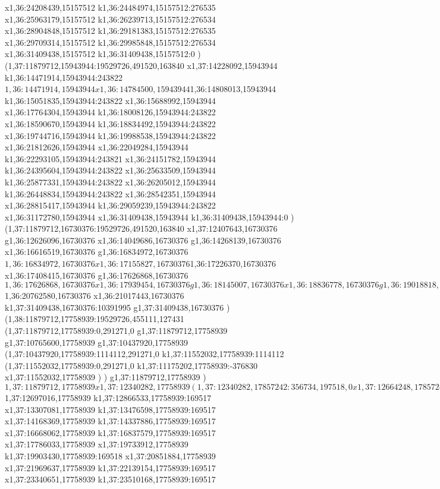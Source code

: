 {x1,36:24208439,15157512
k1,36:24484974,15157512:276535
x1,36:25963179,15157512
k1,36:26239713,15157512:276534
x1,36:28904848,15157512
k1,36:29181383,15157512:276535
x1,36:29709314,15157512
k1,36:29985848,15157512:276534
x1,36:31409438,15157512
k1,36:31409438,15157512:0
)
(1,37:11879712,15943944:19529726,491520,163840
x1,37:14228092,15943944
k1,36:14471914,15943944:243822
$1,36:14471914,15943944
x1,36:14784500,15943944
$1,36:14808013,15943944
k1,36:15051835,15943944:243822
x1,36:15688992,15943944
x1,36:17764304,15943944
k1,36:18008126,15943944:243822
x1,36:18590670,15943944
k1,36:18834492,15943944:243822
x1,36:19744716,15943944
k1,36:19988538,15943944:243822
x1,36:21812626,15943944
x1,36:22049284,15943944
k1,36:22293105,15943944:243821
x1,36:24151782,15943944
k1,36:24395604,15943944:243822
x1,36:25633509,15943944
k1,36:25877331,15943944:243822
x1,36:26205012,15943944
k1,36:26448834,15943944:243822
x1,36:28542351,15943944
x1,36:28815417,15943944
k1,36:29059239,15943944:243822
x1,36:31172780,15943944
x1,36:31409438,15943944
k1,36:31409438,15943944:0
)
(1,37:11879712,16730376:19529726,491520,163840
x1,37:12407643,16730376
g1,36:12626096,16730376
x1,36:14049686,16730376
g1,36:14268139,16730376
x1,36:16616519,16730376
g1,36:16834972,16730376
$1,36:16834972,16730376
x1,36:17155827,16730376
$1,36:17226370,16730376
x1,36:17408415,16730376
g1,36:17626868,16730376
$1,36:17626868,16730376
x1,36:17939454,16730376
g1,36:18145007,16730376
x1,36:18836778,16730376
g1,36:19018818,16730376
x1,36:20074679,16730376
(1,36:20074679,16828679:296503,318577,0
x1,36:20324306,16828679
)
x1,36:20692037,16730376
$1,36:20762580,16730376
x1,36:21017443,16730376
k1,37:31409438,16730376:10391995
g1,37:31409438,16730376
)
(1,38:11879712,17758939:19529726,455111,127431
(1,37:11879712,17758939:0,291271,0
g1,37:11879712,17758939
g1,37:10765600,17758939
g1,37:10437920,17758939
(1,37:10437920,17758939:1114112,291271,0
k1,37:11552032,17758939:1114112
(1,37:11552032,17758939:0,291271,0
k1,37:11175202,17758939:-376830
x1,37:11552032,17758939
)
)
g1,37:11879712,17758939
)
$1,37:11879712,17758939
x1,37:12340282,17758939
(1,37:12340282,17857242:356734,197518,0
x1,37:12664248,17857242
)
$1,37:12697016,17758939
k1,37:12866533,17758939:169517
x1,37:13307081,17758939
k1,37:13476598,17758939:169517
x1,37:14168369,17758939
k1,37:14337886,17758939:169517
x1,37:16668062,17758939
k1,37:16837579,17758939:169517
x1,37:17786033,17758939
x1,37:19733912,17758939
k1,37:19903430,17758939:169518
x1,37:20851884,17758939
x1,37:21969637,17758939
k1,37:22139154,17758939:169517
x1,37:23340651,17758939
k1,37:23510168,17758939:169517
}
